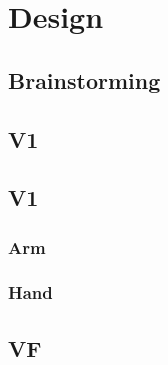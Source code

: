 \section{Design}\insertloftspace
\setcounter{figure}{0}\setcounter{table}{0}

\subsection{Brainstorming}

\subsection{V1}

\subsection{V1}
\subsubsection{Arm}

\subsubsection{Hand}

\subsection{VF}
